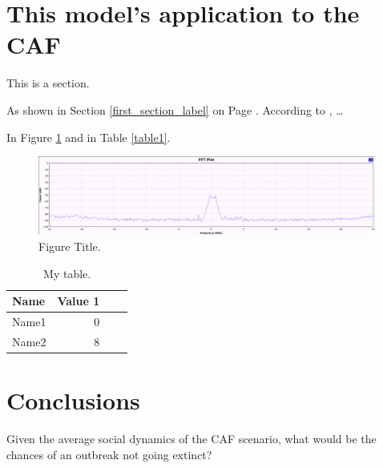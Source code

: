 \documentclass[sr]{drdc-report}
\begin{document}
\section{This model's application to the CAF}
This is a section.

As shown in Section \ref{first_section_label} on Page \pageref{first_section_label}.
According to \cite{archana_lucas_report}, \ldots

In Figure \ref{spectrum} and in Table \ref{table1}.

\begin{figure}
  \includegraphics[width=0.99\textwidth, keepaspectratio=true]{figures/spectrum}
  \caption{Figure Title.}\label{spectrum}
\end{figure}

\clearpage

\begin{table}
\centering
\caption{My table.}\label{table2}
\begin{tabular}{lrrl}
Name & Value 1 \\
\hline
\hline
Name1 & 0 \\
Name2 & 8 \\
\hline
\end{tabular}
\end{table}


\section{Conclusions}
Given the average social dynamics of the CAF scenario, what would be the chances of an outbreak not going extinct?




\docctl

\end{document}
